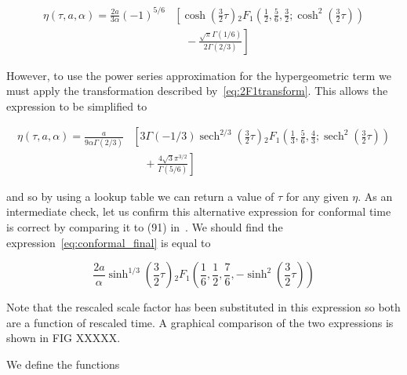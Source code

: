 \documentclass[preprint,notitlepage,amsmath,amssymb,floatfix]{revtex4-1}
\DeclareMathOperator{\sech}{sech}
\begin{document}
\begin{equation}
\begin{split}
\eta\left(\tau, a, \alpha\right) = \frac{2a}{3\alpha}\left(-1\right)^{5/6}&\left[\cosh\left(\frac{3}{2}\tau\right) {}_2F_1\left(\frac{1}{2},\frac{5}{6},\frac{3}{2};\cosh^2\left(\frac{3}{2}\tau\right)\right)\right. \\
& \quad - \left.\frac{\sqrt{\pi}\Gamma\left(1/6\right)}{2\Gamma\left(2/3\right)}\right]
\end{split}
\end{equation}

\noindent However, to use the power series approximation for the hypergeometric term we must apply the transformation described by~\eqref{eq:2F1transform}.
This allows the expression to be simplified to

\begin{equation}
\begin{split}
\label{eq:conformal_final}
\eta\left(\tau, a, \alpha\right) = \frac{a}{9\alpha\Gamma\left(2/3\right)}&\left[3\Gamma\left(-1/3\right)\sech^{2/3}\left(\frac{3}{2}\tau\right) {}_2F_1\left(\frac{1}{3},\frac{5}{6},\frac{4}{3};\sech^2\left(\frac{3}{2}\tau\right)\right)\right. \\
& \quad + \left.\frac{4\sqrt{3}\pi^{3/2}}{\Gamma\left(5/6\right)}\right]
\end{split}
\end{equation}

\noindent and so by using a lookup table we can return a value of $\tau$ for any given $\eta$.  
As an intermediate check, let us confirm this alternative expression for conformal time is correct by comparing it to (91) in~\cite{ref:snc2012}.
We should find the expression~\eqref{eq:conformal_final} is equal to

\begin{equation}
\frac{2a}{\alpha}\sinh^{1/3}\left(\frac{3}{2}\tau\right) {}_2F_1\left(\frac{1}{6},\frac{1}{2},\frac{7}{6},-\sinh^2\left(\frac{3}{2}\tau\right)\right)
\end{equation}

\noindent Note that the rescaled scale factor has been substituted in this expression so both are a function of rescaled time.
A graphical comparison of the two expressions is shown in FIG XXXXX.









We define the functions
\end{document}
